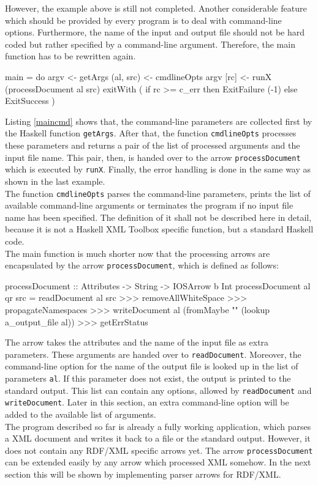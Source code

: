 \documentclass[11pt,a4paper,headsepline, bibtotoc]{scrreprt}
\begin{document}
However, the example above is still not completed. Another considerable feature which should be provided by every program is to deal with command-line options. Furthermore, the name of the input and output file should not be hard coded but rather specified by a command-line argument. Therefore, the main function has to be rewritten again.
\clearpage
\begin{code}[caption=Main Function with Commandline Options,label=maincmd]
main
    = do
      argv      <- getArgs         
      (al, src) <- cmdlineOpts argv       
      [rc]      <- runX (processDocument al src)
      exitWith ( if rc >= c_err
                 then ExitFailure (-1)
                 else ExitSuccess )
\end{code}
Listing \ref{maincmd} shows that, the command-line parameters are collected first by the Haskell function \texttt{getArgs}. After that, the function \texttt{cmdlineOpts} processes these parameters and returns a pair of the list of processed arguments and the input file name. This pair, then, is handed over to the arrow \texttt{processDocument} which is executed by \texttt{runX}. Finally, the error handling is done in the same way as shown in the last example.\\
The function \texttt{cmdlineOpts} parses the command-line parameters, prints the list of available command-line arguments or terminates the program if no input file name has been specified. The definition of it shall not be described here in detail, because it is not a Haskell XML Toolbox specific function, but a standard Haskell code.\\
The main function is much shorter now that the processing arrows are encapsulated by the arrow \texttt{processDocument}, which is defined as follows:
\begin{code}[caption=processDocument, label=processdocument]
processDocument :: Attributes -> String -> IOSArrow b Int
processDocument al qr src
    = readDocument al src 
      >>>
      removeAllWhiteSpace >>> propagateNamespaces
      >>>
      writeDocument al (fromMaybe "" (lookup a_output_file al))
      >>>
      getErrStatus
\end{code}
The arrow takes the attributes and the name of the input file as extra parameters. These arguments are handed over to \texttt{readDocument}. Moreover, the command-line option for the name of the output file is looked up in the list of parameters \texttt{al}. If this parameter does not exist, the output is printed to the standard output. This list can contain any options, allowed by \texttt{readDocument} and \texttt{writeDocument}. Later in this section, an extra command-line option will be added to the available list of arguments.\\
The program described so far is already a fully working application, which parses a XML document and writes it back to a file or the standard output. However, it does not contain any RDF/XML specific arrows yet. The arrow \texttt{processDocument} can be extended easily by any arrow which processed XML somehow. In the next section this will be shown by implementing parser arrows for RDF/XML.
\end{document}
